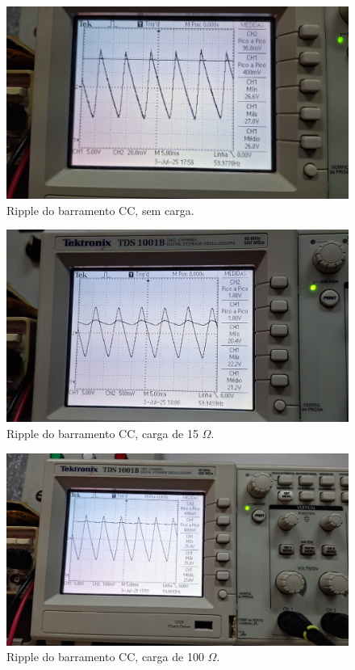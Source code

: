 \documentclass[
	12pt,				%
	oneside,			%
	a4paper,			%
	chapter=TITLE,
	sumario=tradicional,
	english,			%
	brazil				%
]{abntex2}
\begin{document}
\begin{figure}[H]
    \centering
    \includegraphics[width=0.9\linewidth]{images/resultados/vrip-barr-cc-sem-carga.jpeg}
    \caption{Ripple do barramento CC, sem carga.}
    \label{fig:vrip-barr-cc-sem-carga}
\end{figure}

\begin{figure}[H]
    \centering
    \includegraphics[width=0.9\linewidth]{images/resultados/vrip-barr-cc-15.jpeg}
    \caption{Ripple do barramento CC, carga de 15 $\Omega$.}
    \label{fig:vrip-barr-cc-15}
\end{figure}

\begin{figure}[H]
    \centering
    \includegraphics[width=0.9\linewidth]{images/resultados/vrip-barr-cc-100.jpeg}
    \caption{Ripple do barramento CC, carga de 100 $\Omega$.}
    \label{fig:vrip-barr-cc-100}
\end{figure}
\end{document}
